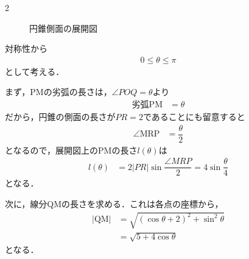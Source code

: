 \documentclass[../../main.tex]{subfiles}
\begin{document}
\begin{multicols}{2}
\begin{figure}[H]
    \caption{円錐側面の展開図}
    \label{2002-2:fig:3}
  \end{figure}

  対称性から
  \begin{align}
    0 \le \theta \le \pi \label{eq:2}
  \end{align}
  として考える．

  まず，PMの劣弧の長さは，$\angle POQ=\theta$より
  \begin{align}
    \text{劣弧PM} & = \theta
  \end{align}
  だから，円錐の側面の長さが$PR=2$であることにも留意すると
  \begin{align}
    \angle \text{MRP} & = \dfrac{\theta}{2}
  \end{align}
  となるので，展開図上のPMの長さ$l(\theta)$は
  \begin{align}
    l(\theta) & = 2|PR|\sin \dfrac{\angle MRP}{2}= 4 \sin \dfrac{\theta}{4} \label{eq:3}
  \end{align}
  となる．

  次に，線分QMの長さを求める．これは各点の座標から，
  \begin{align}
    |\text{QM}|
    & = \sqrt{(\cos\theta+2)^2 + \sin^2\theta}   \\
    & = \sqrt{5+4\cos\theta} \label{eq:4}
  \end{align}
  となる．


\end{multicols}
\end{document}
